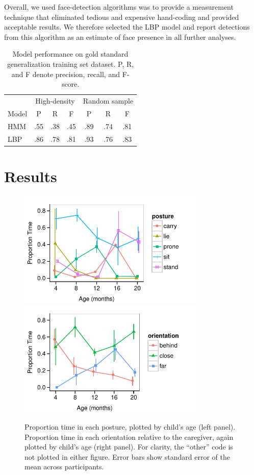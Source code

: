 \documentclass[10pt,letterpaper]{article}
\begin{document}
Overall, we used face-detection algorithms was to provide a measurement technique that eliminated tedious and expensive hand-coding and provided acceptable results. We therefore selected the LBP model and report detections from this algorithm as an estimate of face presence in all further analyses. 

\begin{table}[t]
  \caption{Model performance on gold standard generalization training set dataset. P, R, and F denote precision, recall, and F-score. \label{tab:results} } 
  \begin{center} 
    \begin{tabular}{l|ccc|ccc} 
      \hline
       &  \multicolumn{3}{c|}{High-density} &  \multicolumn{3}{c}{Random sample} \\
      \null Model & P & R & F & P & R & F  \\ 
      \hline 
      HMM &.55  & .38 &  .45 & .89 & .74 & .81   \\
      LBP & .86 & .78 & .81 & .93 & .76 & .83 \\      
    \hline 
    \end{tabular} 
  \end{center}
\end{table}



\section{Results}

\begin{figure}[t]
\includegraphics[width=3.5in]{figures/posture.pdf}
\includegraphics[width=3.5in]{figures/orientation.pdf}
\caption{\label{fig:posture} Proportion time in each posture, plotted by child's age (left panel). Proportion time in each orientation relative to the caregiver, again plotted by child's age (right panel). For clarity, the ``other'' code is not plotted in either figure. Error bars show standard error of the mean across participants.} 
\end{figure}
\end{document}
